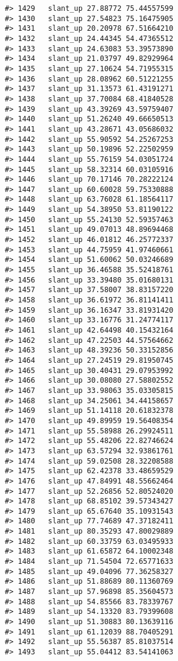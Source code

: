 \documentclass[
]{book}
\theoremstyle{definition}
\theoremstyle{definition}
\theoremstyle{definition}
\theoremstyle{definition}
\theoremstyle{remark}
\begin{document}
\begin{verbatim}
#> 1429   slant_up 27.88772 75.44557599
#> 1430   slant_up 27.54823 75.16475905
#> 1431   slant_up 20.20978 67.51664210
#> 1432   slant_up 24.44345 54.47365512
#> 1433   slant_up 24.63083 53.39573890
#> 1434   slant_up 21.03797 49.82929964
#> 1435   slant_up 27.10624 54.71955315
#> 1436   slant_up 28.08962 60.51221255
#> 1437   slant_up 31.13573 61.43191271
#> 1438   slant_up 37.70084 68.41840528
#> 1439   slant_up 43.39269 43.59759407
#> 1440   slant_up 51.26240 49.66650513
#> 1441   slant_up 43.28671 43.05686032
#> 1442   slant_up 55.90592 54.25267253
#> 1443   slant_up 50.19896 52.22502959
#> 1444   slant_up 55.76159 54.03051724
#> 1445   slant_up 58.32314 60.03105916
#> 1446   slant_up 70.17146 70.28222124
#> 1447   slant_up 60.60028 59.75330888
#> 1448   slant_up 63.76028 61.18564117
#> 1449   slant_up 54.38950 53.81190122
#> 1450   slant_up 55.24130 52.59357463
#> 1451   slant_up 49.07013 48.89694468
#> 1452   slant_up 46.01812 46.25772337
#> 1453   slant_up 44.75959 41.97460661
#> 1454   slant_up 51.60062 50.03246689
#> 1455   slant_up 36.46588 35.52418761
#> 1456   slant_up 33.39480 35.01680131
#> 1457   slant_up 37.58007 38.83157220
#> 1458   slant_up 36.61972 36.81141411
#> 1459   slant_up 36.16347 33.81931420
#> 1460   slant_up 33.16776 31.24774117
#> 1461   slant_up 42.64498 40.15432164
#> 1462   slant_up 47.22503 44.57564662
#> 1463   slant_up 48.39236 50.33152856
#> 1464   slant_up 27.24519 29.81950745
#> 1465   slant_up 30.40431 29.07953992
#> 1466   slant_up 30.08080 27.58802552
#> 1467   slant_up 33.98063 35.03305815
#> 1468   slant_up 34.25061 34.44158657
#> 1469   slant_up 51.14118 20.61832378
#> 1470   slant_up 49.89959 19.56408354
#> 1471   slant_up 55.58988 26.29924511
#> 1472   slant_up 55.48206 22.82746624
#> 1473   slant_up 63.57294 32.93861761
#> 1474   slant_up 59.02508 28.32208588
#> 1475   slant_up 62.42378 33.48659529
#> 1476   slant_up 47.84991 48.55662464
#> 1477   slant_up 52.26856 52.80524020
#> 1478   slant_up 68.85102 39.57343427
#> 1479   slant_up 65.67640 35.10931543
#> 1480   slant_up 77.74689 47.37182411
#> 1481   slant_up 80.35293 47.80029889
#> 1482   slant_up 60.33759 63.03495933
#> 1483   slant_up 61.65872 64.10002348
#> 1484   slant_up 71.54504 72.65771633
#> 1485   slant_up 49.04096 77.36258327
#> 1486   slant_up 51.88689 80.11360769
#> 1487   slant_up 57.96898 85.35604573
#> 1488   slant_up 54.85566 83.78339767
#> 1489   slant_up 54.13320 83.79399608
#> 1490   slant_up 51.30883 80.13639116
#> 1491   slant_up 61.12039 88.70405291
#> 1492   slant_up 55.56387 85.81037514
#> 1493   slant_up 55.04412 83.54141063

\end{verbatim}
\end{document}
